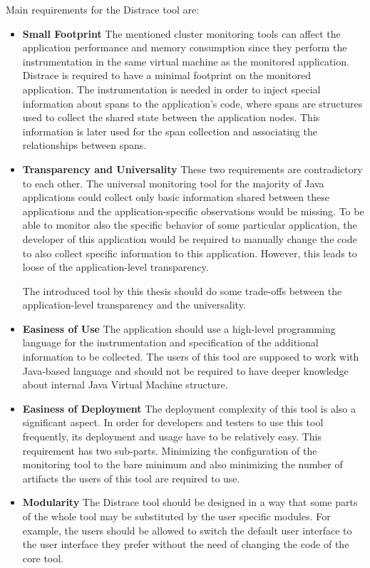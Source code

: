 Main requirements for the Distrace tool are:
\begin{itemize}
	\item \textbf{Small Footprint} \newline
	 The mentioned cluster monitoring tools can affect the application performance and memory consumption since they perform the instrumentation in the same virtual machine as the monitored application. Distrace is required to have a minimal footprint on the monitored application. The instrumentation is needed in order to inject special information about spans to the application's code, where spans are structures used to collect the shared state between the application nodes. This information is later used for the span collection and associating the relationships between spans.
	\item \textbf{Transparency and Universality} \newline
	These two requirements are contradictory to each other. The universal monitoring tool for the majority of Java applications could collect only basic information shared between these applications and the application-specific observations would be missing. To be able to monitor also the specific behavior of some particular application, the developer of this application would be required to manually change the code to also collect specific information to this application. However, this leads to loose of the application-level transparency. 
	
	The introduced tool by this thesis should do some trade-offs between the application-level transparency and the universality. 
	
	\item \textbf{Easiness of Use} \newline
	The application should use a high-level programming language for the instrumentation and specification of the additional information to be collected. The users of this tool are supposed to work with Java-based language and should not be required to have deeper knowledge about internal Java Virtual Machine structure.
	\item \textbf{Easiness of Deployment} \newline
	The deployment complexity of this tool is also a significant aspect. In order for developers and testers to use this tool frequently, its deployment and usage have to be relatively easy. This requirement has two sub-parts. Minimizing the configuration of the monitoring tool to the bare minimum and also minimizing the number of artifacts the users of this tool are required to use.
	\item \textbf{Modularity} \newline
	The Distrace tool should be designed in a way that some parts of the whole tool may be substituted by the user specific modules. For example, the users should be allowed to switch the default user interface to the user interface they prefer without the need of changing the code of the core tool.
\end{itemize}

